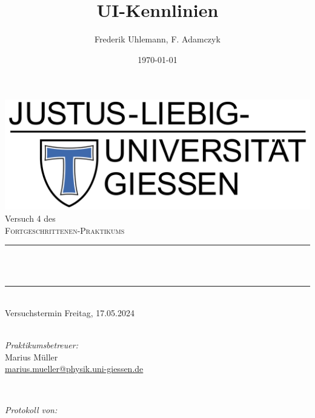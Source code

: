 \documentclass[12pt,a4paper,ngerman]{report}
\title{UI-Kennlinien}		%
\author{Frederik Uhlemann, F. Adamczyk}
\date{\today}
\makeatletter
\let\thetitle\@title
\makeatother
\begin{document}
		
	
	\begin{titlepage}
		\centering
		\vspace*{0.5 cm}
		\includegraphics[width = 0.6 \textwidth]{JLU_Giessen-Logo}	%
		\\[2.0 cm]
		Versuch 4 des\\
		\textsc{\Large  Fortgeschrittenen-Praktikums}\\ [0.3 cm]				%
		\rule{\linewidth}{0.2 mm} \\[0.4 cm]
		{ \huge \bfseries \thetitle}\\%
		\rule{\linewidth}{0.2 mm}\\
		Versuchstermin Freitag, 17.05.2024 \\
		~\\
		[2.0 cm]
		
		
		\begin{minipage}{0.49\textwidth}
			\begin{flushleft}
				\emph{Praktikumsbetreuer:}\\
				Marius Müller\\
				\small{\href{mailto:marius.mueller@physik.uni-giessen.de}{marius.mueller@physik.uni-giessen.de}}
			\end{flushleft}
		\end{minipage}~
		\begin{minipage}{0.49\textwidth}
			\begin{flushright}
				\emph{Protokoll von:} \\
				

\end{flushright}
\end{minipage}
\end{titlepage}
\end{document}
